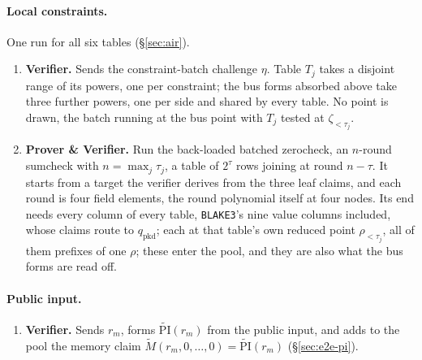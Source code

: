\documentclass[11pt]{article}
\begin{document}
\paragraph{Local constraints.} One run for all six tables (\S\ref{sec:air}).
\begin{enumerate}
\item \textbf{Verifier.} Sends the constraint-batch challenge $\eta$. Table $T_j$ takes a disjoint range of its powers, one per constraint; the bus forms absorbed above take three further powers, one per side and shared by every table. No point is drawn, the batch running at the bus point with $T_j$ tested at $\zeta_{<\tau_j}$.
\item \textbf{Prover \& Verifier.} Run the back-loaded batched zerocheck, an $n$-round sumcheck with $n=\max_j\tau_j$, a table of $2^{\tau}$ rows joining at round $n-\tau$. It starts from a target the verifier derives from the three leaf claims, and each round is four field elements, the round polynomial itself at four nodes. Its end needs every column of every table, \texttt{BLAKE3}'s nine value columns included, whose claims route to $q_{\mathrm{pkd}}$; each at that table's own reduced point $\rho_{<\tau_j}$, all of them prefixes of one $\rho$; these enter the pool, and they are also what the bus forms are read off.
\end{enumerate}

\paragraph{Public input.}
\begin{enumerate}
\item \textbf{Verifier.} Sends $r_m$, forms $\widetilde{\mathrm{PI}}(r_m)$ from the public input, and adds to the pool the memory claim $\widetilde M(r_m,0,\dots,0)=\widetilde{\mathrm{PI}}(r_m)$ (\S\ref{sec:e2e-pi}).
\end{enumerate}
\end{document}
